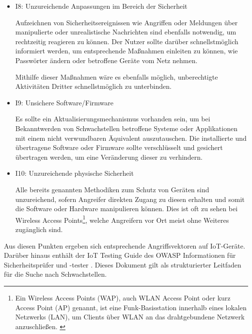 \begin{itemize}
            \item I8: Unzureichende Anpassungen im Bereich der Sicherheit
            
            Aufzeichnen von Sicherheitsereignissen wie Angriffen oder Meldungen über manipulierte oder unrealistische Nachrichten sind ebenfalls notwendig, um rechtzeitig reagieren zu können. Der Nutzer sollte darüber schnellstmöglich informiert werden, um entsprechende Maßnahmen einleiten zu können, wie Passwörter ändern oder betroffene Geräte vom Netz nehmen.
            
            Mithilfe dieser Maßnahmen wäre es ebenfalls möglich, unberechtigte Aktivitäten Dritter schnellstmöglich zu unterbinden.
            
            \item I9: Unsichere Software/Firmware
            
            Es sollte ein Aktualisierungsmechanismus vorhanden sein, um bei Bekanntwerden von Schwachstellen betroffene Systeme oder Applikationen mit einem nicht verwundbaren Äquivalent auszutauschen. 
            Die installierte und übertragene Software oder Firmware sollte verschlüsselt und gesichert übertragen werden, um eine Veränderung dieser zu verhindern.
            
            \item I10: Unzureichende physische Sicherheit
            
            Alle bereits genannten Methodiken zum Schutz von Geräten sind unzureichend, sofern Angreifer direkten Zugang zu diesen erhalten und somit die Software oder Hardware manipulieren können. Dies ist oft zu sehen bei Wireless Access Points\footnote{\glqq Ein Wireless Access Points (WAP), auch WLAN Access Point oder kurz Access Point (AP) genannt, ist eine Funk-Basisstation innerhalb eines lokalen Netzwerks (LAN), um Clients über WLAN an das drahtgebundene Netzwerk anzuschließen.\grqq{} \cite{elektronik_kompendium_2018}}, welche Angreifern vor Ort meist ohne Weiteres zugänglich sind.
        \end{itemize}
        
        Aus diesen Punkten ergeben sich entsprechende Angriffsvektoren auf \ac{IoT}-Geräte. Darüber hinaus enthält der \glqq IoT Testing Guide\grqq{} des \ac{OWASP} Informationen für Sicherheitsprüfer und -tester \cite{smith_2016}. Dieses Dokument gilt als strukturierter Leitfaden für die Suche nach Schwachstellen.
        
